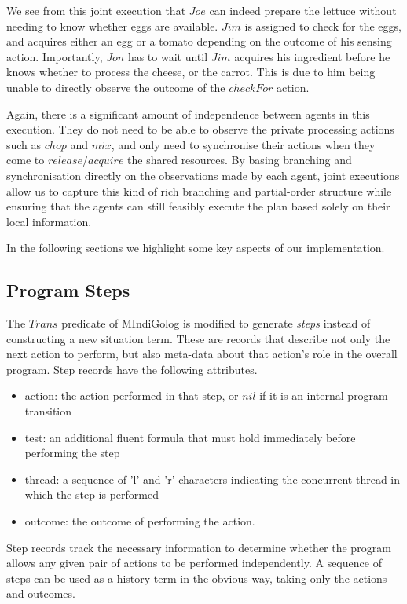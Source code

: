 \newpage{}

We see from this joint execution that $Joe$ can indeed prepare the
lettuce without needing to know whether eggs are available. $Jim$
is assigned to check for the eggs, and acquires either an egg or a
tomato depending on the outcome of his sensing action. Importantly,
$Jon$ has to wait until $Jim$ acquires his ingredient before he
knows whether to process the cheese, or the carrot. This is due to
him being unable to directly observe the outcome of the $checkFor$
action.

Again, there is a significant amount of independence between agents
in this execution. They do not need to be able to observe the private
processing actions such as $chop$ and $mix$, and only need to synchronise
their actions when they come to $release$/$acquire$ the shared resources.
By basing branching and synchronisation directly on the observations
made by each agent, joint executions allow us to capture this kind
of rich branching and partial-order structure while ensuring that
the agents can still feasibly execute the plan based solely on their
local information.

In the following sections we highlight some key aspects of our implementation.


\subsection{Program Steps}

The $Trans$ predicate of MIndiGolog is modified to generate \emph{steps}
instead of constructing a new situation term. These are records that
describe not only the next action to perform, but also meta-data about
that action's role in the overall program. Step records have the following
attributes.

\begin{itemize}
\item action: the action performed in that step, or $nil$ if it is an internal
program transition 
\item test: an additional fluent formula that must hold immediately before
performing the step 
\item thread: a sequence of 'l' and 'r' characters indicating the concurrent
thread in which the step is performed 
\item outcome: the outcome of performing the action. 
\end{itemize}
Step records track the necessary information to determine whether
the program allows any given pair of actions to be performed independently.
A sequence of steps can be used as a history term in the obvious way,
taking only the actions and outcomes.


